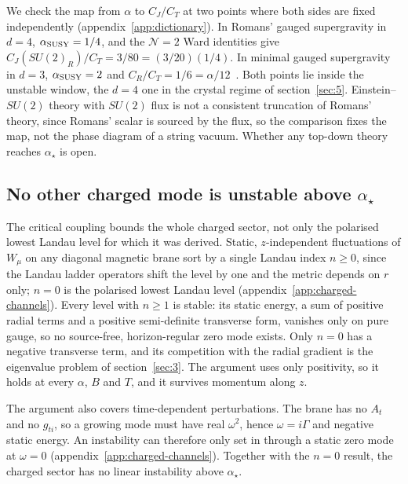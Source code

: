 We check the map from $\alpha$ to $C_J/C_T$ at two points where both sides
are fixed independently (appendix~\ref{app:dictionary}). In Romans' gauged
supergravity in $d = 4$, $\alpha_{\rm SUSY} = 1/4$, and the
$\mathcal{N} = 2$ Ward identities give $C_J(SU(2)_R)/C_T = 3/80 =
(3/20)(1/4)$. In minimal gauged supergravity in $d = 3$,
$\alpha_{\rm SUSY} = 2$ and $C_R/C_T = 1/6 =
\alpha/12$~\cite{Closset:2012ru}. Both points lie inside the
unstable window, the $d = 4$ one in the crystal regime of
section~\ref{sec:5}. Einstein--$SU(2)$ theory with $SU(2)$ flux is not a
consistent truncation of Romans' theory, since Romans' scalar is sourced
by the flux, so the comparison fixes the map, not the phase diagram of a string
vacuum. Whether any top-down theory reaches $\alpha_\star$ is open.

\subsection{No other charged mode is unstable above \texorpdfstring{$\alpha_\star$}{alpha*}}
\label{sec:4.5}

The critical coupling bounds the whole charged sector, not only the
polarised lowest Landau level for which it was derived. Static,
$z$-independent fluctuations of $W_\mu$ on any diagonal magnetic brane sort
by a single Landau index $n \ge 0$, since the Landau ladder operators shift
the level by one and the metric depends on $r$ only; $n = 0$ is the
polarised lowest Landau level (appendix~\ref{app:charged-channels}). Every
level with $n \ge 1$ is stable: its static energy, a sum of positive
radial terms and a positive semi-definite transverse form, vanishes only
on pure gauge, so no source-free, horizon-regular zero mode exists.
Only $n = 0$ has a negative transverse term, and its competition with the
radial gradient is the eigenvalue problem of section~\ref{sec:3}. The
argument uses only positivity, so it holds at every $\alpha$, $B$ and $T$,
and it survives momentum along $z$.

The argument also covers time-dependent perturbations. The brane has no
$A_t$ and no $g_{ti}$, so a growing mode must have real $\omega^2$, hence
$\omega = i\Gamma$ and negative static energy. An instability can therefore
only set in through a static zero mode at $\omega = 0$
(appendix~\ref{app:charged-channels}). Together with the $n = 0$
result, the charged sector has no linear instability above $\alpha_\star$.

